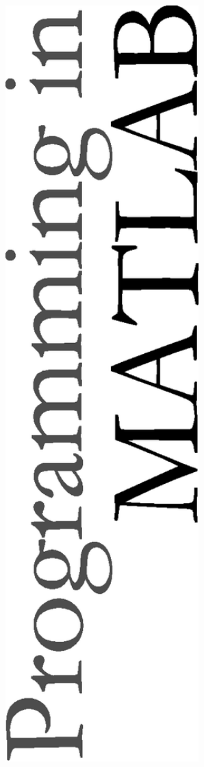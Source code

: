 \begin{titlepage}
\thispagestyle{empty} 

\begin{minipage}{0.3\textwidth}
\begin{center}
\includegraphics[width=0.75\textwidth]{./../eps/title-text}\\[1cm] 

\end{center}
\end{minipage}
\end{titlepage}
